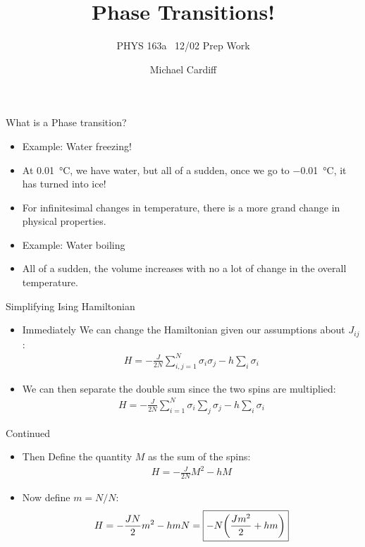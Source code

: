 \documentclass{beamer}
\title{Phase Transitions!}
\author{Michael Cardiff}
\subtitle{PHYS 163a \ 12/02 Prep Work}
\begin{document}
\begin{frame}
  \titlepage
\end{frame}

\begin{frame}{What is a Phase transition?}
  \begin{itemize}
  \item Example: Water freezing!
  \item At \SI{0.01}{\degreeCelsius}, we have water, but all of a sudden, once we go to \SI{-0.01}{\degreeCelsius}, it has turned into ice!
  \item For infinitesimal changes in temperature, there is a more grand change in physical properties. 
  \item Example: Water boiling
  \item All of a sudden, the volume increases with no a lot of change in the overall temperature. 
  \end{itemize}
\end{frame}

\begin{frame}{Simplifying Ising Hamiltonian}
  \begin{itemize}
  \item Immediately We can change the Hamiltonian given our assumptions about $J_{ij}$:
    \begin{align*}
      H=-\frac{J}{2N}\sum_{i,j=1}^N\sigma_i\sigma_j-h\sum_i\sigma_i
    \end{align*}
  \item We can then separate the double sum since the two spins are multiplied:
    \begin{align*}
      H=-\frac{J}{2N}\sum_{i=1}^N\sigma_i\sum_{j}\sigma_j-h\sum_i\sigma_i
    \end{align*}
  \end{itemize}
\end{frame}

\begin{frame}{Continued}
  \begin{itemize}
  \item Then Define the quantity $M$ as the sum of the spins:
    \begin{align*}
      H=-\frac{J}{2N}M^2-hM
    \end{align*}
  \item Now define $m=N/N$:
    \begin{align*}
      H=-\frac{JN}{2}m^2-hmN=\boxed{-N\qty(\frac{Jm^2}{2}+hm)}
    \end{align*}
  \end{itemize}
\end{frame}
\end{document}
